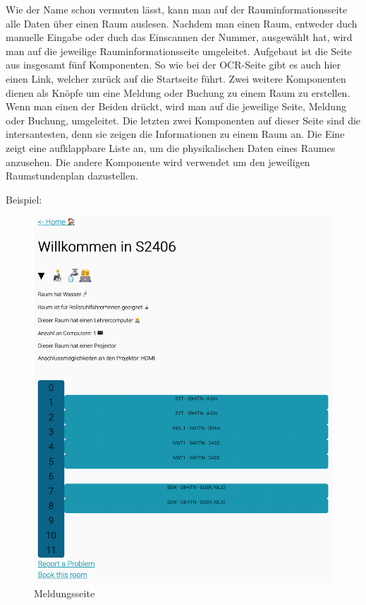 Wie der Name schon vermuten lässt, kann man auf der Rauminformationsseite alle Daten über einen Raum auslesen. Nachdem man einen Raum, entweder duch manuelle Eingabe oder duch das Einscannen der Nummer, ausgewählt hat, wird man auf die jeweilige Rauminformationsseite umgeleitet. Aufgebaut ist die Seite aus insgesamt fünf Komponenten. So wie bei der OCR-Seite gibt es auch hier einen Link, welcher zurück auf die Startseite führt. Zwei weitere Komponenten dienen als Knöpfe um eine Meldung oder Buchung zu einem Raum zu erstellen. Wenn man einen der Beiden drückt, wird man auf die jeweilige Seite, Meldung oder Buchung, umgeleitet. Die letzten zwei Komponenten auf dieser Seite sind die intersantesten, denn sie zeigen die Informationen zu einem Raum an. Die Eine zeigt eine aufklappbare Liste an, um die physikalischen Daten eines Raumes anzusehen. Die andere Komponente wird verwendet um den jeweiligen Raumstundenplan dazustellen.

Beispiel:

\begin{figure}[H]
    \centering
    \includegraphics[width=120mm]{media/WebComponents/Rauminformationsseite_light.png}
    \caption{Meldungsseite}
\end{figure}

